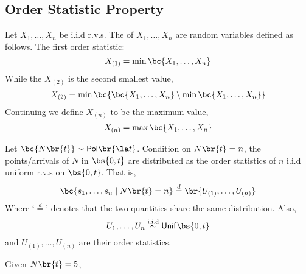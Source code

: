 \documentclass{article}
\newcommand{\Poi}{\mathsf{Poi}}
\newcommand{\Unif}{\mathsf{Unif}}
\begin{document}
    \subsection{Order Statistic Property}

    Let $X_1, \ldots, X_n$ be i.i.d r.v.s. The  of $X_1, \ldots, X_n$ are random variables defined as follows. The first order statistic:
    \[ X_{(1)} = \min\bc{X_1, \ldots, X_n} \]
    While the $X_{(2)}$ is the second smallest value,
    \[ X_{(2)} = \min\bc{\bc{X_1, \ldots, X_n} \setminus \min\bc{{X_1, \ldots, X_n}}} \]
    Continuing we define $X_{(n)}$ to be the maximum value,
    \[ X_{(n)} = \max\bc{X_1, \ldots, X_n} \]
    \begin{theorem}
        Let $\bc{N\br{t}} \sim \Poi\br{\la t}$. Condition on $N\br{t} = n$, the points/arrivals of $N$ in $\bs{0, t}$ are distributed as the order statistics of $n$ i.i.d uniform r.v.s on $\bs{0, t}$. That is,
        \[ \bc{s_1, \ldots, s_n \mid N\br{t} = n} \stackrel{d}{=} \br{U_{(1)}, \ldots, U_{(n)}} \]
        Where `$\stackrel{d}{=}$' denotes that the two quantities share the same distribution. Also,
        \[ U_{1}, \ldots, U_{n} \stackrel{\text{i.i.d}}{\sim} \Unif\bs{0,t} \]
        and $U_{(1)}, \ldots, U_{(n)}$ are their order statistics.
    \end{theorem}

    \begin{example}
        Given $N\br{t} = 5$,
        \begin{center}
        \end{center}
    \end{example}
\end{document}
